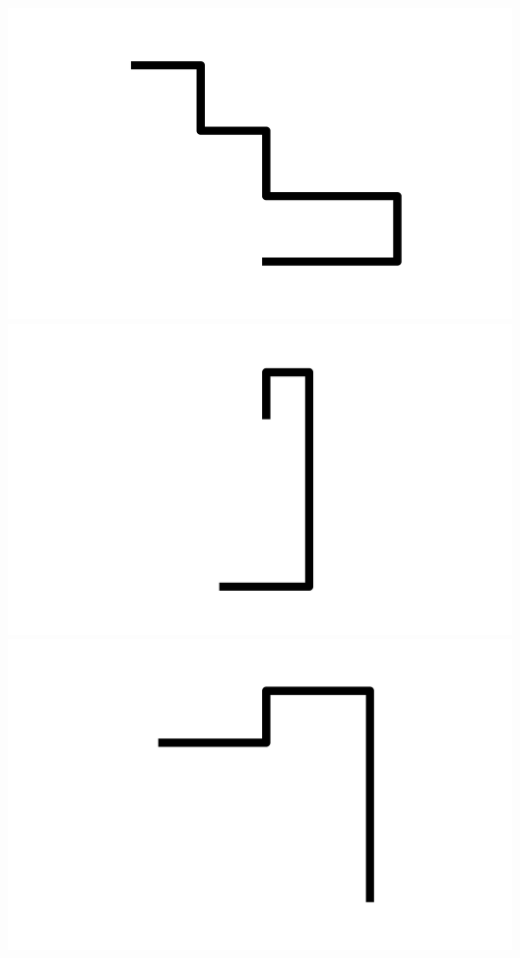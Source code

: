 \documentclass[]{report}
\begin{document}
\includegraphics[scale=.1]{pictures/21/state_cluster_shapes_292.pdf} 
\includegraphics[scale=.1]{pictures/21/state_cluster_shapes_293.pdf} 
\includegraphics[scale=.1]{pictures/21/state_cluster_shapes_294.pdf} 
\end{document}
